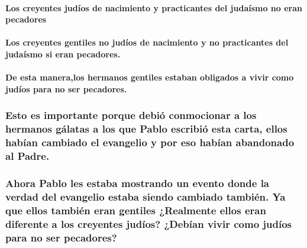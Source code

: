 \documentclass[11a pt,twoside]{article}
\def\textbf#1{#1}%
\let\oldsubsubsection\subsubsection
\renewcommand{\subsubsection}{\needspace{4\baselineskip}\oldsubsubsection}
\let\oldparagraph\paragraph
\renewcommand{\paragraph}{\needspace{3\baselineskip}\oldparagraph}
\begin{document}
\paragraph{\texorpdfstring{Los creyentes judíos de nacimiento y
practicantes del judaísmo \textbf{no} eran
pecadores}{Los creyentes judíos de nacimiento y practicantes del judaísmo no eran pecadores}}\label{los-creyentes-juduxedos-de-nacimiento-y-practicantes-del-judauxedsmo-no-eran-pecadores}

\paragraph{\texorpdfstring{Los creyentes gentiles no judíos de
nacimiento y no practicantes del judaísmo \textbf{si} eran
pecadores.}{Los creyentes gentiles no judíos de nacimiento y no practicantes del judaísmo si eran pecadores.}}\label{los-creyentes-gentiles-no-juduxedos-de-nacimiento-y-no-practicantes-del-judauxedsmo-si-eran-pecadores.}

\paragraph{De esta manera,los hermanos gentiles estaban obligados a
vivir como judíos para no ser
pecadores.}\label{de-esta-maneralos-hermanos-gentiles-estaban-obligados-a-vivir-como-juduxedos-para-no-ser-pecadores.}

\subsubsection{Esto es importante porque debió conmocionar a los
hermanos gálatas a los que Pablo escribió esta carta, ellos habían
cambiado el evangelio y por eso habían abandonado al
Padre.}\label{esto-es-importante-porque-debiuxf3-conmocionar-a-los-hermanos-guxe1latas-a-los-que-pablo-escribiuxf3-esta-carta-ellos-habuxedan-cambiado-el-evangelio-y-por-eso-habuxedan-abandonado-al-padre.}

\subsubsection{Ahora Pablo les estaba mostrando un evento donde la
verdad del evangelio estaba siendo cambiado también. Ya que ellos
también eran gentiles ¿Realmente ellos eran diferente a los creyentes
judíos? ¿Debían vivir como judíos para no ser
pecadores?}\label{ahora-pablo-les-estaba-mostrando-un-evento-donde-la-verdad-del-evangelio-estaba-siendo-cambiado-tambiuxe9n.-ya-que-ellos-tambiuxe9n-eran-gentiles-realmente-ellos-eran-diferente-a-los-creyentes-juduxedos-debuxedan-vivir-como-juduxedos-para-no-ser-pecadores}
\end{document}
